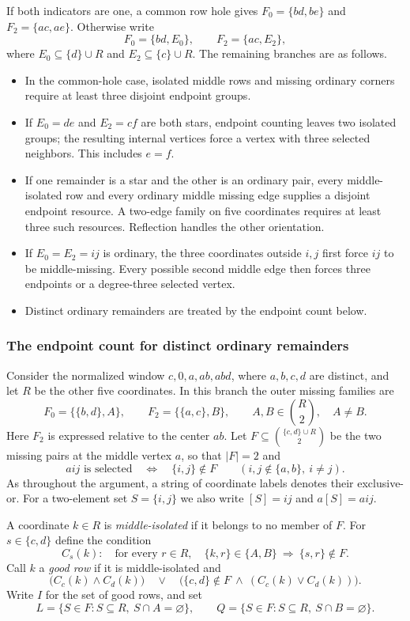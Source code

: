 \documentclass[11pt,a4paper]{article}
\theoremstyle{definition}
\theoremstyle{remark}
\begin{document}
If both indicators are one, a common row hole gives $F_0=\{bd,be\}$ and $F_2=\{ac,ae\}$. Otherwise write
\[
F_0=\{bd,E_0\},\qquad F_2=\{ac,E_2\},
\]
where $E_0\subseteq\{d\}\cup R$ and $E_2\subseteq\{c\}\cup R$. The remaining branches are as follows.
\begin{itemize}
\item In the common-hole case, isolated middle rows and missing ordinary corners require at least three disjoint endpoint groups.
\item If $E_0=de$ and $E_2=cf$ are both stars, endpoint counting leaves two isolated groups; the resulting internal vertices force a vertex with three selected neighbors. This includes $e=f$.
\item If one remainder is a star and the other is an ordinary pair, every middle-isolated row and every ordinary middle missing edge supplies a disjoint endpoint resource. A two-edge family on five coordinates requires at least three such resources. Reflection handles the other orientation.
\item If $E_0=E_2=ij$ is ordinary, the three coordinates outside $i,j$ first force $ij$ to be middle-missing. Every possible second middle edge then forces three endpoints or a degree-three selected vertex.
\item Distinct ordinary remainders are treated by the endpoint count below.
\end{itemize}

\subsubsection*{The endpoint count for distinct ordinary remainders}
Consider the normalized window $c,0,a,ab,abd$, where $a,b,c,d$ are distinct,
and let $R$ be the other five coordinates. In this branch the outer missing
families are
\[
 F_0=\{\{b,d\},A\},\qquad F_2=\{\{a,c\},B\},
 \qquad A,B\in\binom{R}{2},\quad A\ne B.
\]
Here $F_2$ is expressed relative to the center $ab$. Let
$F\subseteq\binom{\{c,d\}\cup R}{2}$ be the two missing pairs at the middle
vertex $a$, so that $|F|=2$ and
\[
 aij\text{ is selected}\quad\Longleftrightarrow\quad\{i,j\}\notin F
 \qquad(i,j\notin\{a,b\},\ i\ne j).
\]
As throughout the argument, a string of coordinate labels denotes their
exclusive-or. For a two-element set $S=\{i,j\}$ we also write $[S]=ij$ and
$a[S]=aij$.

A coordinate $k\in R$ is \emph{middle-isolated} if it belongs to no member
of $F$. For $s\in\{c,d\}$ define the condition
\[
 C_s(k):\quad
 \text{for every }r\in R,\quad
 \{k,r\}\in\{A,B\}\ \Longrightarrow\ \{s,r\}\notin F.
\]
Call $k$ a \emph{good row} if it is middle-isolated and
\[
 \bigl(C_c(k)\wedge C_d(k)\bigr)
 \quad\vee\quad
 \bigl(\{c,d\}\notin F\ \wedge\ (C_c(k)\vee C_d(k))\bigr).
\]
Write $I$ for the set of good rows, and set
\[
 L=\{S\in F:S\subseteq R,\ S\cap A=\varnothing\},\qquad
 Q=\{S\in F:S\subseteq R,\ S\cap B=\varnothing\}.
\]
\end{document}
